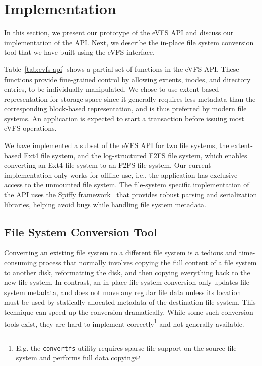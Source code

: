 \vspace{-0.5em}
\section{Implementation\label{sec:Implementation}}

In this section, we present our prototype of the eVFS API and discuss our implementation of the API. Next, we describe the in-place file system conversion tool that we have built using the eVFS interface.

Table~\ref{tab:evfs-api} shows a partial set of functions in the eVFS API. These functions provide fine-grained control by allowing extents, inodes, and directory entries, to be individually manipulated. We chose to use extent-based representation for storage space since it generally requires less metadata than the corresponding block-based representation, and is thus preferred by modern file systems. An application is expected to start a transaction before issuing most eVFS operations. 


We have implemented a subset of the eVFS API for two file systems, the extent-based Ext4 file system, and the log-structured F2FS file system, which enables converting an Ext4 file system to an F2FS file system. Our current implementation only works for offline use, i.e., the application has exclusive access to the unmounted file system. The file-system specific implementation of the API uses the Spiffy framework~\cite{sun2018spiffy} that provides robust parsing and serialization libraries, helping avoid bugs while handling file system metadata.

\vspace{-0.5em}
\subsection{File System Conversion Tool\label{subsec:conversion_tool}}

Converting an existing file system to a different file system is a tedious and time-consuming process that normally involves copying the full content of a file system to another disk, reformatting the disk, and then copying everything back to the new file system. In contrast, an in-place file system conversion only updates file system metadata, and does not move any regular file data unless its location must be used by statically allocated metadata of the destination file system. This technique can speed up the conversion dramatically. While some such conversion tools exist, they are hard to implement correctly\footnote{E.g. the \texttt{convertfs} utility \cite{convertfs} requires sparse file support on the source file system and performs full data copying} and not generally available.

